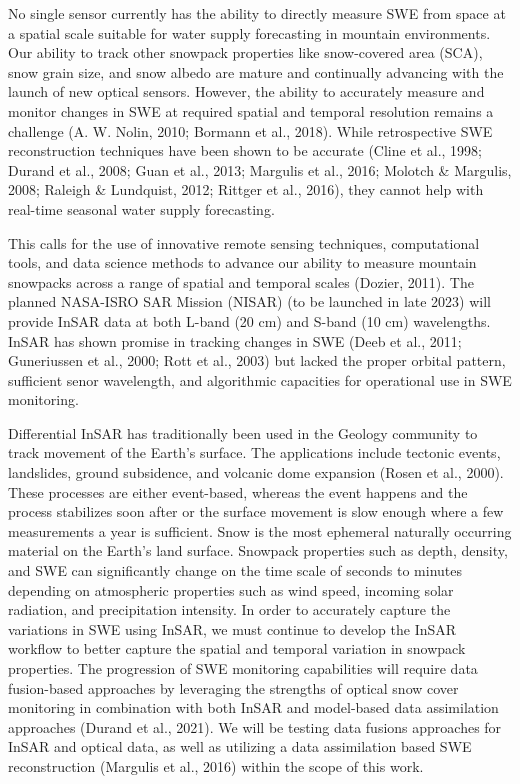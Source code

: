 No single sensor currently has the ability to directly measure SWE from space at a spatial scale suitable for water supply forecasting in mountain environments. Our ability to track other snowpack properties like snow-covered area (SCA), snow grain size, and snow albedo are mature and continually advancing with the launch of new optical sensors. However, the ability to accurately measure and monitor changes in SWE at required spatial and temporal resolution remains a challenge (A. W. Nolin, 2010; Bormann et al., 2018). While retrospective SWE reconstruction techniques have been shown to be accurate (Cline et al., 1998; Durand et al., 2008; Guan et al., 2013; Margulis et al., 2016; Molotch & Margulis, 2008; Raleigh & Lundquist, 2012; Rittger et al., 2016), they cannot help with real-time seasonal water supply forecasting. \par

This calls for the use of innovative remote sensing techniques, computational tools, and data science methods to advance our ability to measure mountain snowpacks across a range of spatial and temporal scales (Dozier, 2011). The planned NASA-ISRO SAR Mission (NISAR) (to be launched in late 2023) will provide InSAR data at both L-band (20 cm) and S-band (10 cm) wavelengths. InSAR has shown promise in tracking changes in SWE (Deeb et al., 2011; Guneriussen et al., 2000; Rott et al., 2003) but lacked the proper orbital pattern, sufficient senor wavelength, and algorithmic capacities for operational use in SWE monitoring. \par

Differential InSAR has traditionally been used in the Geology community to track movement of the Earth’s surface. The applications include tectonic events, landslides, ground subsidence, and volcanic dome expansion (Rosen et al., 2000). These processes are either event-based, whereas the event happens and the process stabilizes soon after or the surface movement is slow enough where a few measurements a year is sufficient.
Snow is the most ephemeral naturally occurring material on the Earth’s land surface. Snowpack properties such as depth, density, and SWE can significantly change on the time scale of seconds to minutes depending on atmospheric properties such as wind speed, incoming solar radiation, and precipitation intensity. In order to accurately capture the variations in SWE using InSAR, we must continue to develop the InSAR workflow to better capture the spatial and temporal variation in snowpack properties.
The progression of SWE monitoring capabilities will require data fusion-based approaches by leveraging the strengths of optical snow cover monitoring in combination with both InSAR and model-based data assimilation approaches (Durand et al., 2021). We will be testing data fusions approaches for InSAR and optical data, as well as utilizing a data assimilation based SWE reconstruction (Margulis et al., 2016) within the scope of this work.





